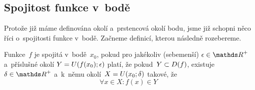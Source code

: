 \subsection{Spojitost funkce v~bodě}
\label{subsec:limita-spojitost-v-bode}

Protože již máme definována okolí a~prstencová okolí bodu, jsme již schopni něco říci
o~spojitosti funkce v~bodě. Začneme definicí, kterou následně rozebereme.

\begin{definition}
    \label{def:funkce-spojitost-v-bode}
    Funkce~$f$ je spojitá v~bodě~$x_0$, pokud pro jakékoliv (sebemenší)
    ${\epsilon \in \positive\reals}$ a~příslušné okolí ${Y = U(f(x_0); \epsilon)}$
    platí, že pokud~${Y \subset D(f)}$, existuje ${\delta \in \positive\reals}$
    a~k~němu okolí~${X = U(x_0; \delta)}$ takové, že
    \begin{equation*}
        \forall x \in X : f(x) \in Y
    \end{equation*}
\end{definition}